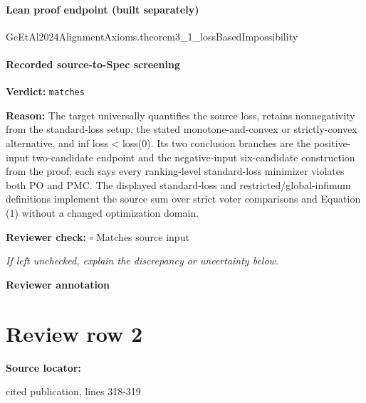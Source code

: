 \documentclass[10pt]{article}
\newcommand{\reviewerbox}{%
  \par\noindent\fbox{\parbox{0.96\linewidth}{\rule{0pt}{0.38in}}}\par
}
\newcommand{\reviewmatch}[1]{%
  \par\noindent\textbf{Reviewer check:} $\square$\; #1\par
  \noindent\emph{If left unchecked, explain the discrepancy or uncertainty below.}\par
}
\begin{document}
\paragraph{Lean proof endpoint (built separately)}\begin{ReviewVerbatim}
GeEtAl2024AlignmentAxioms.theorem3_1_lossBasedImpossibility
\end{ReviewVerbatim}

\paragraph{Recorded source-to-Spec screening}
\textbf{Verdict:} \texttt{matches}
\\
{\raggedright
\textbf{Reason:} The target universally quantifies the source loss, retains nonnegativity from the standard-\allowbreak{}loss setup, the stated monotone-\allowbreak{}and-\allowbreak{}convex or strictly-\allowbreak{}convex alternative, and inf loss < loss(0).\allowbreak{}  Its two conclusion branches are the positive-\allowbreak{}input two-\allowbreak{}candidate endpoint and the negative-\allowbreak{}input six-\allowbreak{}candidate construction from the proof;\allowbreak{} each says every ranking-\allowbreak{}level standard-\allowbreak{}loss minimizer violates both PO and PMC.\allowbreak{}  The displayed standard-\allowbreak{}loss and restricted/\allowbreak{}global-\allowbreak{}infimum definitions implement the source sum over strict voter comparisons and Equation (1) without a changed optimization domain.\allowbreak{}
\par}
\reviewmatch{Matches source input}
\noindent\textbf{Reviewer annotation}\par
\reviewerbox
\clearpage
\hypertarget{source-claim-31b67361459405c7}{}
\section*{Review row 2}
\textbf{Source locator:} {\footnotesize\raggedright cited publication, lines 318-\allowbreak{}319\par}
\end{document}
